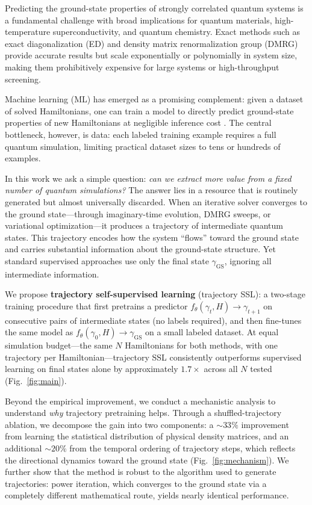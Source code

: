 \documentclass[12pt]{article}
\newcommand{\gam}{\gamma}
\newcommand{\gGS}{\gamma_{\mathrm{GS}}}
\begin{document}
Predicting the ground-state properties of strongly correlated quantum systems is
a fundamental challenge with broad implications for quantum materials, high-temperature
superconductivity, and quantum chemistry.
Exact methods such as exact diagonalization (ED) and density matrix renormalization
group (DMRG) provide accurate results but scale exponentially or polynomially in
system size, making them prohibitively expensive for large systems or high-throughput
screening.

Machine learning (ML) has emerged as a promising complement: given a dataset of
solved Hamiltonians, one can train a model to directly predict ground-state
properties of new Hamiltonians at negligible inference cost
\citep{carrasquilla2017machine, carleo2017solving, han2019solving}.
The central bottleneck, however, is data: each labeled training example requires
a full quantum simulation, limiting practical dataset sizes to tens or hundreds of
examples.

In this work we ask a simple question: \emph{can we extract more value from a
fixed number of quantum simulations?}
The answer lies in a resource that is routinely generated but almost universally discarded.
When an iterative solver converges to the ground state---through imaginary-time evolution,
DMRG sweeps, or variational optimization---it produces a trajectory of intermediate
quantum states.
This trajectory encodes how the system ``flows'' toward the ground state and carries
substantial information about the ground-state structure.
Yet standard supervised approaches use only the final state $\gGS$,
ignoring all intermediate information.

We propose \textbf{trajectory self-supervised learning} (trajectory SSL):
a two-stage training procedure that first pretrains a predictor
$f_\theta(\gam_t, H) \to \gam_{t+1}$ on consecutive pairs of intermediate states
(no labels required), and then fine-tunes the same model as
$f_\theta(\gam_0, H) \to \gGS$ on a small labeled dataset.
At equal simulation budget---the same $N$ Hamiltonians for both methods,
with one trajectory per Hamiltonian---trajectory SSL consistently outperforms
supervised learning on final states alone by approximately $1.7\times$
across all $N$ tested (Fig.~\ref{fig:main}).

Beyond the empirical improvement, we conduct a mechanistic analysis to understand
\emph{why} trajectory pretraining helps.
Through a shuffled-trajectory ablation, we decompose the gain into two components:
a $\sim\!33\%$ improvement from learning the statistical distribution of
physical density matrices, and an additional $\sim\!20\%$ from the temporal
ordering of trajectory steps, which reflects the directional dynamics toward
the ground state (Fig.~\ref{fig:mechanism}).
We further show that the method is robust to the algorithm used to generate
trajectories: power iteration, which converges to the ground state via a
completely different mathematical route, yields nearly identical performance.
\end{document}
